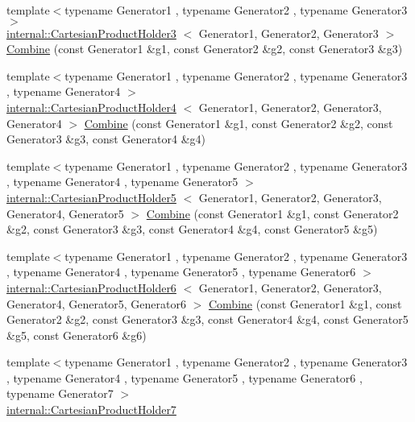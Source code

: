 \begin{DoxyCompactItemize}
{\footnotesize template$<$typename Generator1 , typename Generator2 , typename Generator3 $>$ }\\\hyperlink{classtesting_1_1internal_1_1CartesianProductHolder3}{internal\-::\-Cartesian\-Product\-Holder3}\*
$<$ \-Generator1, \-Generator2, \*
\-Generator3 $>$ \hyperlink{namespacetesting_a77b89180fd846e275236409d9704eda2}{\-Combine} (const \-Generator1 \&g1, const \-Generator2 \&g2, const \-Generator3 \&g3)
\item 
{\footnotesize template$<$typename Generator1 , typename Generator2 , typename Generator3 , typename Generator4 $>$ }\\\hyperlink{classtesting_1_1internal_1_1CartesianProductHolder4}{internal\-::\-Cartesian\-Product\-Holder4}\*
$<$ \-Generator1, \-Generator2, \*
\-Generator3, \-Generator4 $>$ \hyperlink{namespacetesting_abf420810fcd8190a98c2927862805a3f}{\-Combine} (const \-Generator1 \&g1, const \-Generator2 \&g2, const \-Generator3 \&g3, const \-Generator4 \&g4)
\item 
{\footnotesize template$<$typename Generator1 , typename Generator2 , typename Generator3 , typename Generator4 , typename Generator5 $>$ }\\\hyperlink{classtesting_1_1internal_1_1CartesianProductHolder5}{internal\-::\-Cartesian\-Product\-Holder5}\*
$<$ \-Generator1, \-Generator2, \*
\-Generator3, \-Generator4, \*
\-Generator5 $>$ \hyperlink{namespacetesting_a81505186d64f5b5763a0e268bc2e5650}{\-Combine} (const \-Generator1 \&g1, const \-Generator2 \&g2, const \-Generator3 \&g3, const \-Generator4 \&g4, const \-Generator5 \&g5)
\item 
{\footnotesize template$<$typename Generator1 , typename Generator2 , typename Generator3 , typename Generator4 , typename Generator5 , typename Generator6 $>$ }\\\hyperlink{classtesting_1_1internal_1_1CartesianProductHolder6}{internal\-::\-Cartesian\-Product\-Holder6}\*
$<$ \-Generator1, \-Generator2, \*
\-Generator3, \-Generator4, \*
\-Generator5, \-Generator6 $>$ \hyperlink{namespacetesting_adccda33f9b3ad18896cb341979fe12b4}{\-Combine} (const \-Generator1 \&g1, const \-Generator2 \&g2, const \-Generator3 \&g3, const \-Generator4 \&g4, const \-Generator5 \&g5, const \-Generator6 \&g6)
\item 
{\footnotesize template$<$typename Generator1 , typename Generator2 , typename Generator3 , typename Generator4 , typename Generator5 , typename Generator6 , typename Generator7 $>$ }\\\hyperlink{classtesting_1_1internal_1_1CartesianProductHolder7}{internal\-::\-Cartesian\-Product\-Holder7}\*

\end{DoxyCompactItemize}
